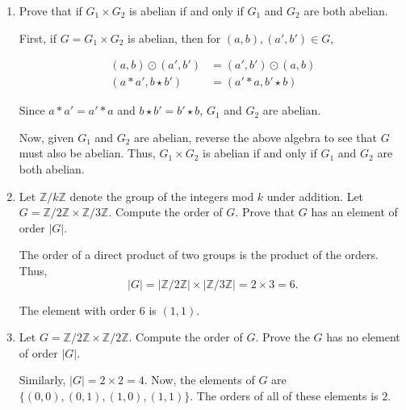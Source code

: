 \documentclass{article}
\begin{document}
\begin{enumerate}
{\begin{enumerate}
            \item {
                Prove that if \(G_1 \times G_2\) is abelian if and only if \(G_1\) and \(G_2\) are both abelian.
        
                First, if \(G = G_1 \times G_2\) is abelian, then for 
                \((a,b), (a', b') \in G\),
                
                \begin{align}
                    (a,b) \odot (a',b') &= (a', b') \odot (a, b) \\
                    (a*a', b \star b')  &= (a' * a, b' \star b) 
                \end{align}
                
                Since \(a*a' = a'*a\) and \(b \star b' = b'\star b\), \(G_1\) and 
                \(G_2\) are abelian.

                Now, given \(G_1\) and \(G_2\) are abelian, reverse the above 
                algebra to see that \(G\) must also be abelian. Thus, 
                \(G_1 \times G_2\) is abelian if and only if \(G_1\) and \(G_2\) 
                are both abelian.

            }

            \item {
                Let \(\mathbb{Z}/k\mathbb{Z}\) denote the group of the integers mod \(k\) under addition. Let \(G = \mathbb{Z}/2\mathbb{Z} \times \mathbb{Z}/3\mathbb{Z}\). Compute the order of \(G\). Prove that \(G\) has an element of order \(|G|\).
        
                The order of a direct product of two groups is the product of the 
                orders. Thus,
                \[|G| = |\mathbb{Z}/2\mathbb{Z}| \times |\mathbb{Z}/3\mathbb{Z}| = 2 \times 3 = 6.\]

                The element with order 6 is \((1,1)\).
            }

            \item {
                Let \(G = \mathbb{Z}/2\mathbb{Z} \times \mathbb{Z}/2\mathbb{Z}\). 
                Compute the order of \(G\). Prove the \(G\) has no element of order \(|G|\).

                Similarly, \(|G| = 2 \times 2 = 4\). Now, the elements of \(G\) 
                are \(\{ (0,0), (0,1), (1,0), (1,1)  \}\). The orders of all of these 
                elements is \(2\).
            }
        \end{enumerate}
    }
\end{enumerate}
\pagebreak
\end{document}
